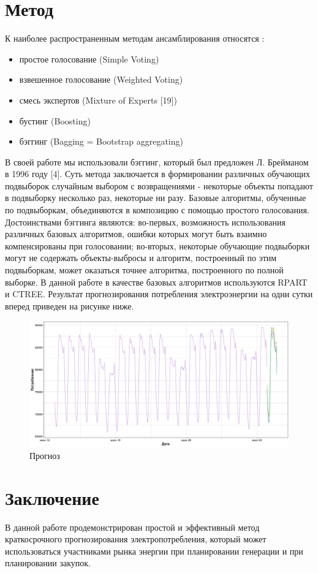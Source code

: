 \documentclass[60x84/16,8pt]{ittmm}
\begin{document}
\section{Метод}
\label{sec:methods}
К наиболее распространенным методам ансамблирования относятся \cite{Tihonov2006}:
\begin{itemize}
    \item простое голосование (Simple Voting)
    \item взвешенное голосование (Weighted Voting)
    \item смесь экспертов (Mixture of Experts [19])
    \item бустинг (Boosting)
    \item бэггинг (Bagging = Bootstrap aggregating)
\end{itemize}
В своей работе мы использовали бэггинг, который был предложен Л. Брейманом в 1996
году [4]. Суть метода заключается в формировании различных обучающих подвыборок случайным выбором с возвращениями - некоторые объекты попадают в подвыборку несколько раз, некоторые ни разу. Базовые алгоритмы, обученные по подвыборкам, объединяются в композицию с помощью простого голосования. Достоинствами бэггинга являются: во-первых, возможность использования различных базовых алгоритмов, ошибки которых могут быть взаимно компенсированы при голосовании; во-вторых, некоторые обучающие подвыборки могут не содержать объекты-выбросы и алгоритм, построенный по этим подвыборкам, может оказаться точнее алгоритма, построенного по полной выборке. В данной работе в качестве базовых алгоритмов используются RPART и CTREE. Результат прогнозирования потребления электроэнергии на одни сутки вперед приведен на рисунке ниже.
\begin{figure}
  \centering
  \includegraphics[width=0.8\linewidth]{Ru/prediction.jpeg}
  \caption{Прогноз}
  \label{fig:prediction}
\end{figure}


\section{Заключение}
В данной работе продемонстрирован простой и эффективный метод краткосрочного прогнозирования электропотребления, который может использоваться участниками рынка энергии при планировании генерации и при планировании закупок.
\end{document}
